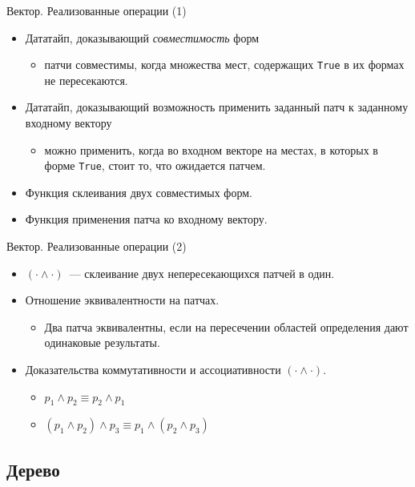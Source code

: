 \begin{frame}{Вектор. Реализованные операции (1)}
  \begin{itemize}
  \item Дататайп, доказывающий \emph{совместимость} форм
    \begin{itemize}
    \item патчи совместимы, когда множества мест, содержащих
      \texttt{True} в их формах не пересекаются.
    \end{itemize}
  \item Дататайп, доказывающий возможность применить заданный патч к
    заданному входному вектору
    \begin{itemize}
    \item можно применить, когда во входном векторе на местах, в
      которых в форме \texttt{True}, стоит то, что ожидается патчем.
    \end{itemize}
  \item Функция склеивания двух совместимых форм.
  \item Функция применения патча ко входному вектору.
  \end{itemize}
\end{frame}

\begin{frame}{Вектор. Реализованные операции (2)}
  \begin{itemize}
  \item $(\cdot \wedge \cdot)$~--- склеивание двух непересекающихся
    патчей в один.
  \item Отношение эквивалентности на патчах.
    \begin{itemize}
    \item Два патча эквивалентны, если на пересечении областей
      определения дают одинаковые результаты.
    \end{itemize}
  \item Доказательства коммутативности и ассоциативности $(\cdot
    \wedge \cdot)$.
    \begin{itemize}
    \item $p_1 \wedge p_2 \equiv p_2 \wedge p_1$
    \item $(p_1 \wedge p_2) \wedge p_3 \equiv p_1 \wedge (p_2 \wedge p_3)$
    \end{itemize}
  \end{itemize}
\end{frame}

\subsection{Дерево}

